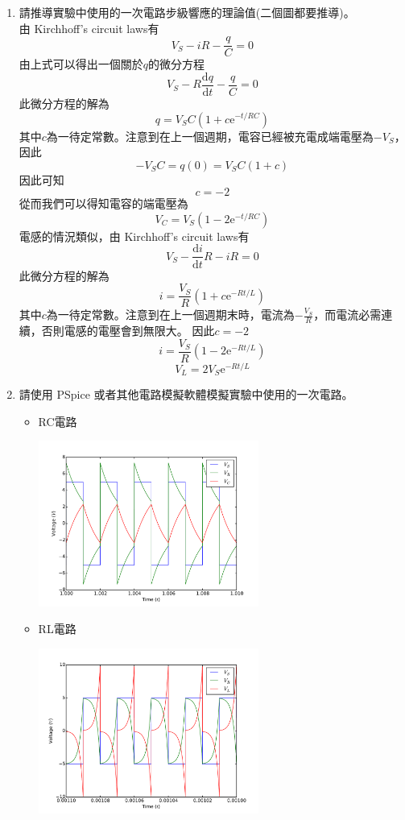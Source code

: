 \documentclass[12pt, a4paper]{article}
\def\large{\fontsize{14}{21}\selectfont}
\newcommand{\mD}{\mathrm{d}}
\begin{document}
  \begin{enumerate}[itemsep=20pt, topsep=10pt]
    \item {\large 請推導實驗中使用的一次電路步級響應的理論值(二個圖都要推導)。} \\[10pt]
      由 Kirchhoff's circuit laws有
      \[
        V_S - iR - \frac{q}{C} = 0 
      \]
      由上式可以得出一個關於$q$的微分方程
      \[
        V_S - R\frac{ \mD q }{ \mD t} - \frac{q}{C} = 0 
      \]
      此微分方程的解為
      \[
        q = V_S C \left( 1 + c \mathrm{e}^{-t/RC} \right) 
      \]
      其中$c$為一待定常數。注意到在上一個週期，電容已經被充電成端電壓為$-V_S$，因此
      \[
        -V_S C = q(0) = V_S C ( 1 + c )
      \]
      因此可知
      \[
        c = -2
      \]
      從而我們可以得知電容的端電壓為
      \[
        V_C = V_S \left( 1 - 2 \mathrm{e}^{-t/RC} \right)
      \]
      電感的情況類似，由 Kirchhoff's circuit laws有
      \[
        V_S - \frac{\mD i}{\mD t}R - i R = 0 
      \]
      此微分方程的解為
      \[
        i = \frac{V_S}{R} \left( 1 + c \mathrm{e}^{-Rt/L} \right) 
      \]
      其中$c$為一待定常數。注意到在上一個週期末時，電流為$-\frac{V_S}{R}$，而電流必需連續，否則電感的電壓會到無限大。
      因此$c = -2$
      \[
        i = \frac{V_S}{R} \left( 1 - 2 \mathrm{e}^{-Rt/L} \right) 
      \]
      \[
        V_L = 2 V_S \mathrm{e}^{-Rt/L} 
      \]
    \item {\large 請使用 PSpice 或者其他電路模擬軟體模擬實驗中使用的一次電路。} \\[10pt]

      \begin{itemize}
        \item RC電路
      \begin{center}
        \includegraphics[width=0.6\textwidth]{plt1.pdf}
      \end{center}
        \item RL電路
      \begin{center}
        \includegraphics[width=0.6\textwidth]{plt2.pdf}
      \end{center}
  \end{itemize}
  
  \end{enumerate}
\end{document}
